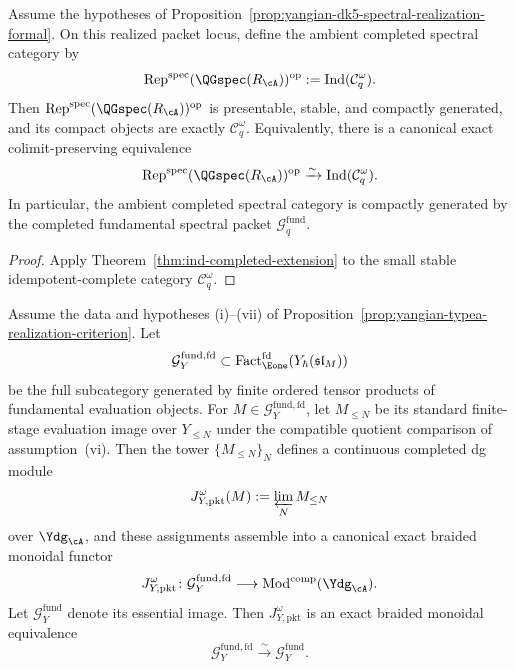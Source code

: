 \begin{corollary}
\label{cor:yangian-dk5-spectral-packet-ind}
Assume the hypotheses of
Proposition~\ref{prop:yangian-dk5-spectral-realization-formal}.  On
this realized packet locus, define the ambient completed spectral
category by
\[
\operatorname{Rep}^{\mathrm{spec}}(\QGspec(R_{\cA}))^{\mathrm{op}}
:=
\operatorname{Ind}(\mathcal{C}_q^\omega).
\]
Then
\(\operatorname{Rep}^{\mathrm{spec}}(\QGspec(R_{\cA}))^{\mathrm{op}}\)
is presentable, stable, and compactly generated, and its compact
objects are exactly \(\mathcal{C}_q^\omega\).  Equivalently, there is a
canonical exact colimit-preserving equivalence
\[
\operatorname{Rep}^{\mathrm{spec}}(\QGspec(R_{\cA}))^{\mathrm{op}}
\xrightarrow{\sim}
\operatorname{Ind}(\mathcal{C}_q^\omega).
\]
In particular, the ambient completed spectral category is compactly
generated by the completed fundamental spectral packet
\(\mathcal{G}^{\mathrm{fund}}_{q}\).
\end{corollary}

\begin{proof}
Apply Theorem~\ref{thm:ind-completed-extension} to the small stable
idempotent-complete category \(\mathcal{C}_q^\omega\).
\end{proof}

\begin{proposition}
\label{prop:yangian-dg-fundamental-packet-realization}
Assume the data and hypotheses \textup{(i)}--\textup{(vii)} of
Proposition~\ref{prop:yangian-typea-realization-criterion}.  Let
\[
\mathcal{G}^{\mathrm{fund,fd}}_{Y}
\subset
\operatorname{Fact}_{\Eone}^{\mathrm{fd}}(Y_\hbar(\mathfrak{sl}_M))
\]
be the full subcategory generated by finite ordered tensor products of
fundamental evaluation objects.  For
\(M\in\mathcal{G}^{\mathrm{fund,fd}}_{Y}\), let \(M_{\le N}\) be its
standard finite-stage evaluation image over \(Y_{\le N}\) under the
compatible quotient comparison of
assumption~\textup{(vi)}.  Then the tower \(\{M_{\le N}\}_N\) defines a
continuous completed dg module
\[
J_{Y,\mathrm{pkt}}^\omega(M)
:=
\varprojlim_N M_{\le N}
\]
over \(\Ydg_{\cA}\), and these assignments assemble into a canonical
exact braided monoidal functor
\[
J_{Y,\mathrm{pkt}}^\omega\colon
\mathcal{G}^{\mathrm{fund,fd}}_{Y}
\longrightarrow
\operatorname{Mod}^{\mathrm{comp}}(\Ydg_{\cA}).
\]
Let \(\mathcal{G}^{\mathrm{fund}}_{Y}\) denote its essential image.
Then \(J_{Y,\mathrm{pkt}}^\omega\) is an exact braided monoidal
equivalence
\[
\mathcal{G}^{\mathrm{fund,fd}}_{Y}
\xrightarrow{\sim}
\mathcal{G}^{\mathrm{fund}}_{Y}.
\]

\end{proposition}

